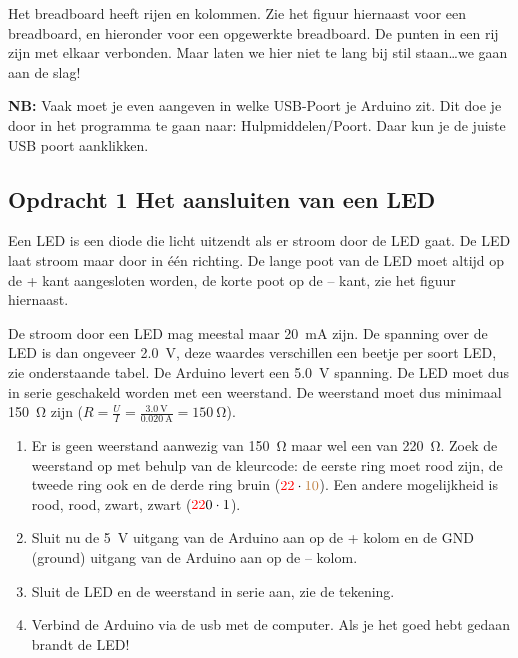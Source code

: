 \documentclass{arduino}
\begin{document}
Het breadboard heeft rijen en kolommen. Zie het figuur hiernaast voor een breadboard, en hieronder voor een opgewerkte breadboard. De punten in een rij zijn met elkaar verbonden. Maar laten we hier niet te lang bij stil staan\dots we gaan aan de slag!

\textbf{NB:} Vaak moet je even aangeven in welke USB-Poort je Arduino zit. Dit doe je door in het programma te gaan naar: Hulpmiddelen/Poort. Daar kun je de juiste USB poort aanklikken.

\newpage

\subsection{Opdracht 1 Het aansluiten van een LED}

Een LED is een diode die licht uitzendt als er stroom door de LED gaat. De LED laat stroom maar door in één richting. De lange poot van de LED moet altijd op de + kant aangesloten worden, de korte poot op de – kant, zie het figuur hiernaast.

De stroom door een LED mag meestal maar \SI{20}{\milli\ampere} zijn. De spanning over de LED is dan ongeveer \SI{2.0}{\volt}, deze waardes verschillen een beetje per soort LED, zie onderstaande tabel. De Arduino levert een \SI{5.0}{\volt} spanning. De LED moet dus in serie geschakeld worden met een weerstand. De weerstand moet dus minimaal \SI{150}{\ohm} zijn ($R = \frac{U}{I} = \frac{\SI{3.0}{\volt}}{\SI{0.020}{\ampere}} = \SI{150}{\ohm}$).


\begin{enumerate}
\item Er is geen weerstand aanwezig van \SI{150}{\ohm} maar wel een van \SI{220}{\ohm}. Zoek de weerstand op met behulp van de kleurcode: de eerste ring moet rood zijn, de tweede ring ook en de derde ring bruin ($\textcolor{red}{2}\textcolor{red}{2} \cdot \textcolor{brown}{10}$). Een andere mogelijkheid is rood, rood, zwart, zwart ($\textcolor{red}{2}\textcolor{red}{2}\textcolor{black}{0} \cdot \textcolor{black}{1}$).

\item Sluit nu de \SI{5}{\volt} uitgang van de Arduino aan op de + kolom en de GND (ground) uitgang van de Arduino aan op de – kolom.

\item Sluit de LED en de weerstand in serie aan, zie de tekening.

\item Verbind de Arduino via de usb met de computer. Als je het goed hebt gedaan brandt de LED!
\end{enumerate}
\end{document}
